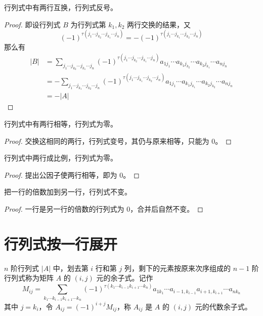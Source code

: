 \begin{theorem}
	行列式中有两行互换，行列式反号。
\end{theorem}

\begin{proof}
	即设行列式 $B$ 为行列式第 $k_1,k_2$ 两行交换的结果，又
	$$(-1)^{\tau(j_1\cdots j_{k_2} \cdots j_{k_1} \cdots j_n)} =- (-1)^{\tau(j_1\cdots j_{k_1} \cdots j_{k_2} \cdots j_n)}$$
	那么有
	\begin{equation*}
		\begin{aligned}
			|B| &= \sum_{j_1\cdots j_{k_2} \cdots j_{k_1} \cdots j_n}(-1)^{\tau(j_1\cdots j_{k_2} \cdots j_{k_1} \cdots j_n)}
			a_{1j_1}\cdots a_{k_1j_{k_2}}\cdots a_{k_2j_{k_1}}\cdots a_{nj_n}\\
			&=-\sum_{j_1\cdots j_{k_1} \cdots j_{k_2} \cdots j_n}(-1)^{\tau(j_1\cdots j_{k_1} \cdots j_{k_2} \cdots j_n)}
			a_{1j_1}\cdots a_{k_1j_{k_1}}\cdots a_{k_2j_{k_2}}\cdots a_{nj_n}\\
			&=-|A|
		\end{aligned}
	\end{equation*}
\end{proof}

\begin{theorem}
	行列式中有两行相等，行列式为零。
\end{theorem}

\begin{proof}
	交换这相同的两行，行列式变号，其仍与原来相等，只能为 $0$。
\end{proof}

\begin{theorem}
	行列式中两行成比例，行列式为零。
\end{theorem}

\begin{proof}
	提出公因子使两行相等，即为 $0$。
\end{proof}

\begin{theorem}
	把一行的倍数加到另一行，行列式不变。
\end{theorem}

\begin{proof}
	一行是另一行的倍数的行列式为 $0$，合并后自然不变。
\end{proof}

\section{行列式按一行展开}

\begin{definition}[代数余子式]
	$n$ 阶行列式 $|A|$ 中，划去第 $i$ 行和第 $j$ 列，剩下的元素按原来次序组成的 $n-1$ 阶行列式称为矩阵 $A$ 的 $(i,j)$ 元的余子式。记作 
	$$M_{ij} = \sum_{k_1\cdots k_{i-1}k_{i+1}\cdots k_n}(-1)^{\tau(k_1\cdots k_{i-1}k_{i+1}\cdots k_n)}a_{1k_1}\cdots a_{i-1,k_{i-1}}a_{i+1,k_{i+1}}\cdots a_{nk_n}$$
	其中 $j=k_i$，令 $A_{ij}=(-1)^{i+j}M_{ij}$，称 $A_{ij}$ 是 $A$ 的 $(i,j)$ 元的代数余子式。
\end{definition}

